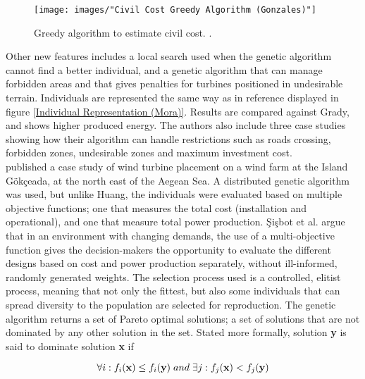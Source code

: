 \begin{figure}[h!]
\begin{center}
\texttt{[image: images/"Civil Cost Greedy Algorithm (Gonzales)"]}
\caption{Greedy algorithm to estimate civil cost. \citep{Gonzalez}.}
\label{Civil Cost Greedy Algorithm (Gonzales)}
\end{center}
\end{figure}


\noindent Other new features includes a local search used when the genetic algorithm cannot find a better individual, and a genetic algorithm that can manage forbidden areas and that gives penalties for turbines positioned in undesirable terrain. Individuals are represented the same way as in reference \citep{Mora} displayed in figure \ref{Individual Representation (Mora)}. Results are compared against Grady, and shows higher produced energy. The authors also include three case studies showing how their algorithm can handle restrictions such as roads crossing, forbidden zones, undesirable zones and maximum investment cost.\\


\noindent \cite{Sisbot} published a case study of wind turbine placement on a wind farm at the Island G{\"o}k\c{c}eada, at the north east of the Aegean Sea. A distributed genetic algorithm was used, but unlike Huang, the individuals were evaluated based on multiple objective functions; one that measures the total cost (installation and operational), and one that measure total power production. \c{S}i\c{s}bot et al. argue that in an environment with changing demands, the use of a multi-objective function gives the decision-makers the opportunity to evaluate the different designs based on cost and power production separately, without ill-informed, randomly generated weights. The selection process used is a controlled, elitist process, meaning that not only the fittest, but also some individuals that can spread diversity to the population are selected for reproduction. The genetic algorithm returns a set of Pareto optimal solutions; a set of solutions that are not dominated by any other solution in the set. Stated more formally, solution \textbf{y} is said to dominate solution \textbf{x} if

\begin{equation}
\forall i: f_i(\textbf{x}) \leq f_i(\textbf{y}) \hspace{1mm} and \hspace{1mm} \exists j: f_j(\textbf{x}) < f_j(\textbf{y}) 
\label{Dominated solutions}
\end{equation}

